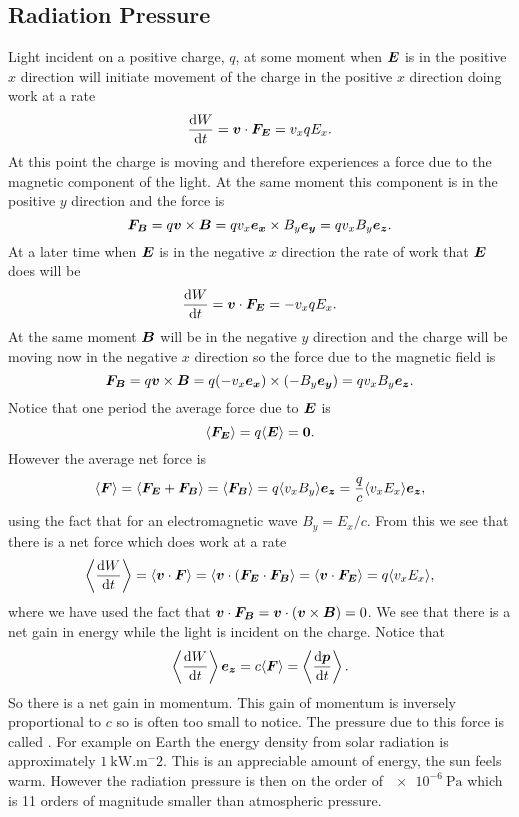     \subsection{Radiation Pressure}
    Light incident on a positive charge, \(q\), at some moment when \(\bm{E}\) is in the positive \(x\) direction will initiate movement of the charge in the positive \(x\) direction doing work at a rate
    \[\dv{W}{t} = \bm{v}\cdot\bm{F_E} = v_xqE_x.\]
    At this point the charge is moving and therefore experiences a force due to the magnetic component of the light.
    At the same moment this component is in the positive \(y\) direction and the force is
    \[\bm{F_B} = q\bm{v}\times\bm{B} = qv_x\bm{e_{x}}\times B_y\bm{e_{y}} = qv_xB_y\bm{e_{z}}.\]
    At a later time when \(\bm{E}\) is in the negative \(x\) direction the rate of work that \(\bm{E}\) does will be
    \[\dv{W}{t} = \bm{v}\cdot\bm{F_E} = -v_xqE_x.\]
    At the same moment \(\bm{B}\) will be in the negative \(y\) direction and the charge will be moving now in the negative \(x\) direction so the force due to the magnetic field is
    \[\bm{F_B} = q\bm{v}\times\bm{B} = q(-v_x\bm{e_{x}})\times(-B_y\bm{e_{y}}) = qv_xB_y\bm{e_{z}}.\]
    Notice that one period the average force due to \(\bm{E}\) is 
    \[\langle{\bm{F_E}}\rangle = q\langle{\bm{E}}\rangle = \bm{0}.\]
    However the average net force is
    \[\langle{\bm{F}}\rangle = \langle{\bm{F_E} + \bm{F_B}}\rangle = \langle{\bm{F_B}}\rangle = q\langle{v_xB_y}\rangle\bm{e_{z}} = \frac{q}{c}\langle{v_xE_x}\rangle\bm{e_{z}},\]
    using the fact that for an electromagnetic wave \(B_y = E_x/c\).
    From this we see that there is a net force which does work at a rate
    \[\left\langle {\dv{W}{t}} \right\rangle = \langle{\bm{v}\cdot\bm{F}}\rangle = \langle{\bm{v}\cdot(\bm{F_E}\cdot\bm{F_B}}\rangle = \langle{\bm{v}\cdot\bm{F_E}}\rangle = q\langle{v_xE_x}\rangle,\]
    where we have used the fact that \(\bm{v}\cdot\bm{F_B} = \bm{v}\cdot(\bm{v}\times\bm{B}) = 0\).
    We see that there is a net gain in energy while the light is incident on the charge.
    Notice that
    \[\left\langle {\dv{W}{t}} \right\rangle\bm{e_{z}} = c\langle{\bm{F}}\rangle = \left\langle {\dv{\bm{p}}{t}} \right\rangle.\]
    So there is a net gain in momentum.
    This gain of momentum is inversely proportional to \(c\) so is often too small to notice.
    The pressure due to this force is called .
    For example on Earth the energy density from solar radiation is approximately \(\SI{1}{\kilo\watt.\meter^-2}\).
    This is an appreciable amount of energy, the sun feels warm.
    However the radiation pressure is then on the order of \(\SI{e-6}{\pascal}\) which is 11 orders of magnitude smaller than atmospheric pressure.
    
